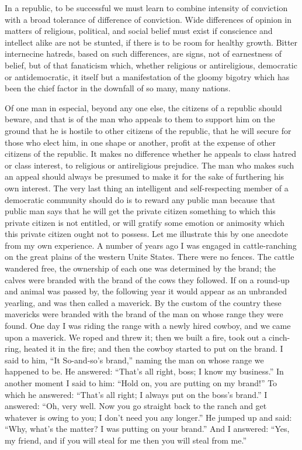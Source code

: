 \documentclass[a4paper]{amsbook}
\begin{document}
In a republic, to be successful we must learn to combine intensity of conviction with a broad tolerance of difference of conviction. Wide differences of opinion in matters of religious, political, and social belief must exist if conscience and intellect alike are not be stunted, if there is to be room for healthy growth. Bitter internecine hatreds, based on such differences, are signs, not of earnestness of belief, but of that fanaticism which, whether religious or antireligious, democratic or antidemocratic, it itself but a manifestation of the gloomy bigotry which has been the chief factor in the downfall of so many, many nations.

Of one man in especial, beyond any one else, the citizens of a republic should beware, and that is of the man who appeals to them to support him on the ground that he is hostile to other citizens of the republic, that he will secure for those who elect him, in one shape or another, profit at the expense of other citizens of the republic. It makes no difference whether he appeals to class hatred or class interest, to religious or antireligious prejudice. The man who makes such an appeal should always be presumed to make it for the sake of furthering his own interest. The very last thing an intelligent and self-respecting member of a democratic community should do is to reward any public man because that public man says that he will get the private citizen something to which this private citizen is not entitled, or will gratify some emotion or animosity which this private citizen ought not to possess. Let me illustrate this by one anecdote from my own experience. A number of years ago I was engaged in cattle-ranching on the great plains of the western Unite States. There were no fences. The cattle wandered free, the ownership of each one was determined by the brand; the calves were branded with the brand of the cows they followed. If on a round-up and animal was passed by, the following year it would appear as an unbranded yearling, and was then called a maverick. By the custom of the country these mavericks were branded with the brand of the man on whose range they were found. One day I was riding the range with a newly hired cowboy, and we came upon a maverick. We roped and threw it; then we built a fire, took out a cinch-ring, heated it in the fire; and then the cowboy started to put on the brand. I said to him, “It So-and-so's brand,” naming the man on whose range we happened to be. He answered: “That's all right, boss; I know my business.” In another moment I said to him: “Hold on, you are putting on my brand!” To which he answered: “That's all right; I always put on the boss's brand.” I answered: “Oh, very well. Now you go straight back to the ranch and get whatever is owing to you; I don't need you any longer.” He jumped up and said: “Why, what's the matter? I was putting on your brand.” And I answered: “Yes, my friend, and if you will steal for me then you will steal from me.”
\end{document}
